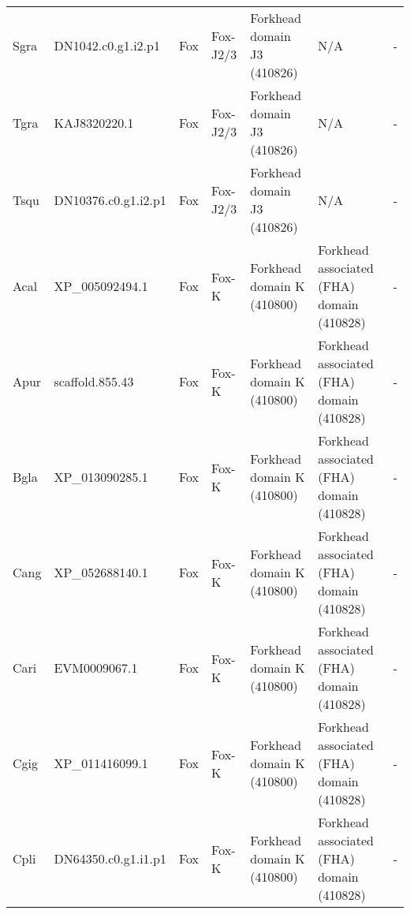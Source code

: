 \documentclass[../main.tex]{subfiles}
\begin{document}
\begin{landscape}
\begin{longtable}{lllllll}
		Sgra           & DN1042.c0.g1.i2.p1    & Fox            & Fox-J2/3            & Forkhead domain J3 (410826)                 & N/A                                                                    & -                    \\
		Tgra           & KAJ8320220.1          & Fox            & Fox-J2/3            & Forkhead domain J3 (410826)                 & N/A                                                                    & -                    \\
		Tsqu           & DN10376.c0.g1.i2.p1   & Fox            & Fox-J2/3            & Forkhead domain J3 (410826)                 & N/A                                                                    & -                    \\
		Acal           & XP\_005092494.1       & Fox            & Fox-K               & Forkhead domain K (410800)                  & Forkhead associated (FHA) domain (410828)                              & -                    \\
		Apur           & scaffold.855.43       & Fox            & Fox-K               & Forkhead domain K (410800)                  & Forkhead associated (FHA) domain (410828)                              & -                    \\
		Bgla           & XP\_013090285.1       & Fox            & Fox-K               & Forkhead domain K (410800)                  & Forkhead associated (FHA) domain (410828)                              & -                    \\
		Cang           & XP\_052688140.1       & Fox            & Fox-K               & Forkhead domain K (410800)                  & Forkhead associated (FHA) domain (410828)                              & -                    \\
		Cari           & EVM0009067.1          & Fox            & Fox-K               & Forkhead domain K (410800)                  & Forkhead associated (FHA) domain (410828)                              & -                    \\
		Cgig           & XP\_011416099.1       & Fox            & Fox-K               & Forkhead domain K (410800)                  & Forkhead associated (FHA) domain (410828)                              & -                    \\
		Cpli           & DN64350.c0.g1.i1.p1   & Fox            & Fox-K               & Forkhead domain K (410800)                  & Forkhead associated (FHA) domain (410828)                              & -                    \\

\end{longtable}
\end{landscape}
\end{document}

